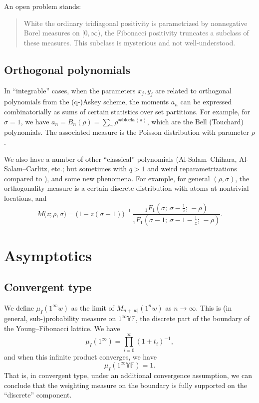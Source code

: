 \documentclass[letterpaper,11pt,oneside,reqno]{article}
\numberwithin{equation}{section}
\theoremstyle{definition}
\begin{document}
An open problem stands:
\begin{quote}
	White the ordinary tridiagonal positivity is parametrized by
	nonnegative
	Borel measures on $[0,\infty)$, the Fibonacci positivity
	truncates a subclass of these measures. This
	subclass is mysterious and not well-understood.
\end{quote}

\subsection{Orthogonal polynomials}

In ``integrable'' cases, when the
parameters $x_j,y_j$ are related to orthogonal polynomials
from the (q-)Askey scheme,
the moments $a_n$ can be expressed combinatorially
as sums of certain statistics over set partitions.
For example, for $\sigma=1$, we have
$a_n=B_n(\rho)=\sum_\pi \rho^{\#\text{blocks}(\pi)}$,
which are the Bell (Touchard) polynomials.
The associated measure is the Poisson distribution
with parameter $\rho$.

We also have a number of other ``classical'' polynomials
(Al-Salam--Chihara, Al-Salam--Carlitz, etc.; but sometimes with $q>1$ and
weird reparametrizations compared to \cite{Koekoek1996}),
and some new phenomena. For example, for general $(\rho,\sigma)$,
the orthogonality measure is
a certain discrete distribution with atoms at nontrivial locations, and
\begin{equation}
	\label{eq:MGF_shifted_charlier_solution}
	M\big(z;\rho, \sigma\big)
	=
	\big(1 - z(\sigma-1) \big)^{-1} \,
        \frac{
		{_1F_1}\left(\sigma  ; \, \sigma - \frac{1}{z}  ; \, -\rho \right)
		}{
		{_1F_1}\left(\sigma - 1 ; \, \sigma -1 - \frac{1}{z}  ; \, -\rho \right)}.
\end{equation}


\section{Asymptotics}

\subsection{Convergent type}

We define $\mu_I(1^\infty w)$ as the limit of
$M_{n+|w|}(1^n w)$ as $n\to\infty$.
This is (in general, sub-)probability measure on $1^\infty\mathbb{YF}$, the
discrete part of the boundary of the Young--Fibonacci lattice.
We have
\begin{equation*}
	\mu_I(1^\infty)=\prod_{i=0}^{\infty}(1+t_i)^{-1},
\end{equation*}
and when this infinite product converges, we have
\begin{equation*}
	\mu_I(1^\infty \mathbb{YF})=1.
\end{equation*}
That is, in convergent type, under an
additional convergence assumption,
we can conclude that the weighting measure
on the boundary is fully supported on the
``discrete'' component.
\end{document}
